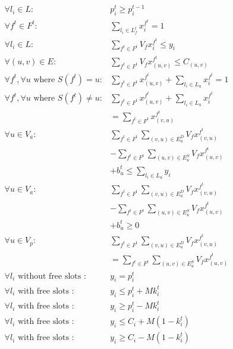 \begin{algorithm}
\begin{algorithmic}
		\renewcommand{\algorithmicensure}{ \textbf{Subject to:}}
		\ENSURE
            $$\begin{array}{ll}
            \forall l_i \in L : &p_i^t \geq p_i^{t-1} \\
            \forall f^{t} \in F^{t} : &\sum_{l_i \in L_f^{t}} x_i^{f^{t}}=1 \\
            \forall l_i \in L : &\sum_{f^{t} \in F^{t}} V_f x_i^{f^{t}} \leq y_i \\
            \forall(u, v) \in E  : &\sum_{f^{t} \in F^{t}} V_f x_{(u, v)}^{f^{t}} \leq C_{(u, v)} \\
            \forall f^{t}, \forall u \text { where } S(f^{t})=u : &\sum_{f^{t} \in F^{t}} x_{(u, v)}^{f^{t}}+\sum_{l_i \in L_u} x_i^{f^{t}}=1 \\
            \forall f^{t}, \forall u \text { where } S(f^{t}) \neq u  : &\sum_{f^{t} \in F^{t}} x_{(u, v)}^{f^{t}}+\sum_{l_i \in L_u} x_i^{f^{t}} \\& =\sum_{f^{t} \in F^{t}} x_{(v, u)}^{f^{t}} \\
            \forall u \in V_a : &\sum_{f^{t} \in F^{t}} \sum_{(v, u) \in E_u^D} V_f x_{(v, u)}^{f^{t}} \\&-\sum_{f^{t} \in F^{t}} \sum_{(u, v) \in E_u^S} V_f x_{(u, v)}^{f^{t}} \\& +b_u^t \leq \sum_{l_i \in L_u} y_i \\
            \forall u \in V_a : &\sum_{f^{t} \in F^{t}} \sum_{(v, u) \in E_u^D} V_f x_{(v, u)}^{f^{t}} \\&-\sum_{f^{t} \in F^{t}} \sum_{(u, v) \in E_u^S} V_f x_{(u, v)}^{f^{t}} \\& +b_u^t \geq 0 \\
            \forall u \in V_p : &\sum_{f^{t} \in F^{t}} \sum_{(v, u) \in E_u^D} V_f x_{(v, u)}^{f^{t}} \\& =\sum_{f^{t} \in F^{t}} \sum_{(u, v) \in E_u^S} V_f x_{(u, v)}^{f^{t}} \\
            \forall l_i \text { without free slots } : &y_i=p_i^t \\
            \forall l_i \text { with free slots } : &y_i \leq p_i^t+M k_i^t \\
            \forall l_i \text { with free slots } : &y_i \geq p_i^t-M k_i^t \\
            \forall l_i \text { with free slots } : &y_i \leq C_i+M\left(1-k_i^t\right) \\
            \forall l_i \text { with free slots } : &y_i \geq C_i-M\left(1-k_i^t\right) \\
            \end{array}$$
	\end{algorithmic}
\end{algorithm}






